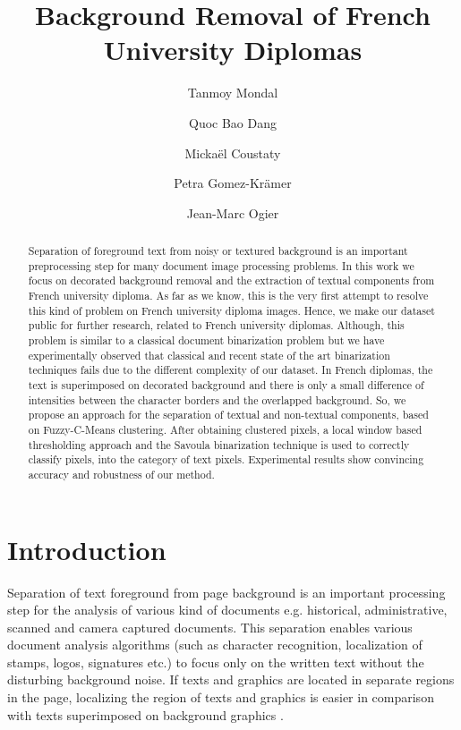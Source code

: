 \documentclass[runningheads]{llncs}
\begin{document}
\title{Background Removal of French University Diplomas}

\author{Tanmoy Mondal \and Quoc Bao Dang \and Mickaël Coustaty \and Petra Gomez-Krämer\and Jean-Marc Ogier}


%
\maketitle              %
%
\begin{abstract}
		Separation of foreground text from noisy or textured background is an important preprocessing step for many document image processing problems. In this work we focus on decorated background removal and the extraction of textual components from French university diploma. As far as we know, this is the very first attempt to resolve this kind of problem on French university diploma images. Hence, we make our dataset public for further research, related to French university diplomas. Although, this problem is similar to a classical document binarization problem but we have experimentally observed that classical and recent state of the art binarization techniques fails due to the different complexity of our dataset. In French diplomas, the text is superimposed on decorated background and there is only a small difference of intensities between the character borders and the overlapped background. So, we propose an approach for the separation of textual and non-textual components, based on Fuzzy-C-Means clustering. After obtaining clustered pixels, a local window based thresholding approach and the Savoula binarization technique is used to correctly classify pixels, into the category of text pixels. Experimental results show convincing accuracy and robustness of our method.  

\end{abstract}


	\section{Introduction}
\label{intro}
Separation of text foreground from page background is an important processing step for the analysis of various kind of documents e.g. historical, administrative, scanned and camera captured documents. This separation enables various document analysis algorithms (such as character recognition, localization of stamps, logos, signatures etc.) to focus only on the written text without the disturbing background noise. If texts and graphics are located in separate regions in the page, localizing the region of texts and graphics is easier in comparison with texts superimposed on background graphics \cite{Ahmed2012a}.
\end{document}
